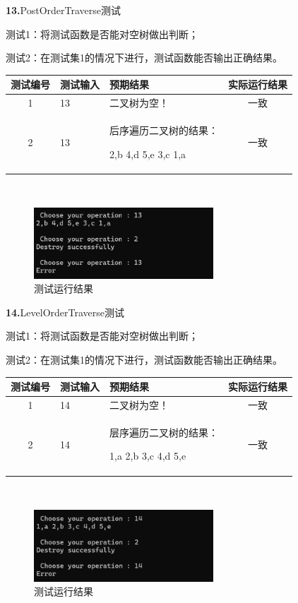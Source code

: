 \documentclass[supercite]{Experimental_Report}
\theoremstyle{definition}
\begin{document}
\noindent\textbf{13.}PostOrderTraverse测试

测试1：将测试函数是否能对空树做出判断；

测试2：在测试集1的情况下进行，测试函数能否输出正确结果。

\vspace{0.5em}

\begin{tabular}{|c|p{2.7cm}|p{4.5cm}|c|}
	\hline
	测试编号 & 测试输入 & 预期结果 & 实际运行结果 \\
	\hline
	1 & 13 & 二叉树为空！ & 一致 \\
	\hline
	2 & 13 & 后序遍历二叉树的结果：
 
2,b 4,d 5,e 3,c 1,a & 一致 \\
	\hline
\end{tabular}

~\

\begin{figure}[H]
 	\centering
 	\includegraphics[width=0.6\textwidth]{images/二叉树测试13.png}
 	\caption{测试运行结果}
 	\label{txlab}
 \end{figure}

\noindent\textbf{14.}LevelOrderTraverse测试

测试1：将测试函数是否能对空树做出判断；

测试2：在测试集1的情况下进行，测试函数能否输出正确结果。

\vspace{0.5em}

\begin{tabular}{|c|p{2.7cm}|p{4.5cm}|c|}
	\hline
	测试编号 & 测试输入 & 预期结果 & 实际运行结果 \\
	\hline
	1 & 14 & 二叉树为空！ & 一致 \\
	\hline
	2 & 14 & 层序遍历二叉树的结果：

 1,a 2,b 3,c 4,d 5,e & 一致 \\
	\hline
\end{tabular}

~\

\begin{figure}[H]
 	\centering
 	\includegraphics[width=0.6\textwidth]{images/二叉树测试14.png}
 	\caption{测试运行结果}
 	\label{txlab}
 \end{figure}
\end{document}
